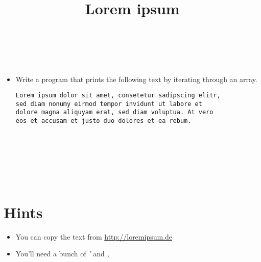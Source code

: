 

\usepackage{hyperref}
\title{Lorem ipsum} %
\author{} %
\renewcommand{\difficulty}{Medium} %
\renewcommand{\requirements}{Arrays, C-Strings} %
\renewcommand{\aims}{Iterating through an array} %


 \maketitle
 \taskinfos

\ \\\ \\
\begin{itemize}
	\item Write a program that prints the following text by iterating through an array.
	\begin{lstlisting}[numbers=none]
Lorem ipsum dolor sit amet, consetetur sadipscing elitr,
sed diam nonumy eirmod tempor invidunt ut labore et
dolore magna aliquyam erat, sed diam voluptua. At vero
eos et accusam et justo duo dolores et ea rebum.
\end{lstlisting}
\end{itemize}	
 
 
\ \\\ \\\ \\\ \\\ \\
\section*{Hints}
	\begin{itemize}
		\item You can copy the text from \url{http://loremipsum.de}
		\item You'll need a bunch of \textit{'} and \textit{,}
	\end{itemize}
 

